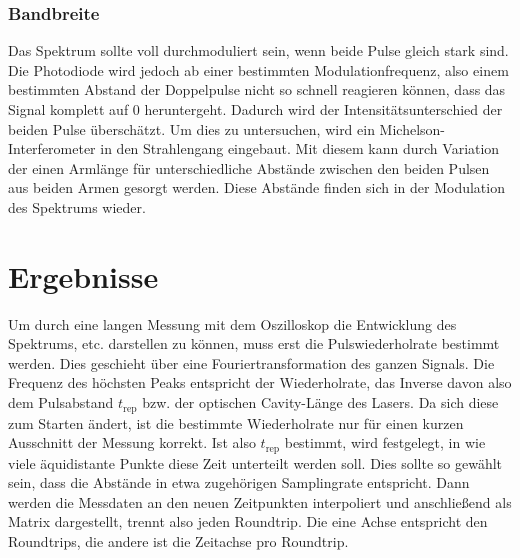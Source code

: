\documentclass[bachelor,       %
               twoside,        %
               BCOR10mm,       %
               english,ngerman, %
               ]{GAUBM}
\begin{document}
\subsection{Bandbreite}
Das Spektrum sollte voll durchmoduliert sein, wenn beide Pulse gleich stark sind.
Die Photodiode wird jedoch ab einer bestimmten Modulationfrequenz, also einem bestimmten Abstand der Doppelpulse nicht so schnell reagieren können, dass das Signal komplett auf 0 heruntergeht.
Dadurch wird der Intensitätsunterschied der beiden Pulse überschätzt.
Um dies zu untersuchen, wird ein Michelson-Interferometer in den Strahlengang eingebaut.
Mit diesem kann durch Variation der einen Armlänge für unterschiedliche Abstände zwischen den beiden Pulsen aus beiden Armen gesorgt werden.
Diese Abstände finden sich in der Modulation des Spektrums wieder.

\chapter{Ergebnisse}
Um durch eine langen Messung mit dem Oszilloskop die Entwicklung des Spektrums, etc. darstellen zu können, muss erst die Pulswiederholrate bestimmt werden.
Dies geschieht über eine Fouriertransformation des ganzen Signals.
Die Frequenz des höchsten Peaks entspricht der Wiederholrate, das Inverse davon also dem Pulsabstand $t_\text{rep}$ bzw. der optischen Cavity-Länge des Lasers.
Da sich diese zum Starten ändert, ist die bestimmte Wiederholrate nur für einen kurzen Ausschnitt der Messung korrekt.
Ist also $t_\text{rep}$ bestimmt, wird festgelegt, in wie viele äquidistante Punkte diese Zeit unterteilt werden soll.
Dies sollte so gewählt sein, dass die Abstände in etwa zugehörigen Samplingrate entspricht.
Dann werden die Messdaten an den neuen Zeitpunkten interpoliert und anschließend als Matrix dargestellt, trennt also jeden Roundtrip.
Die eine Achse entspricht den Roundtrips, die andere ist die Zeitachse pro Roundtrip.
\end{document}
